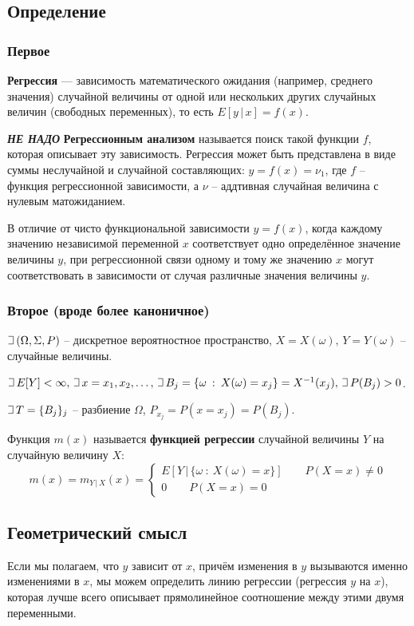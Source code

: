\documentclass{article}
\def\letus{%
    \mathord{\setbox0=\hbox{$\exists$}%
             \hbox{\kern 0.125\wd0%
                   \vbox to \ht0{%
                      \hrule width 0.75\wd0%
                      \vfill%
                      \hrule width 0.75\wd0}%
                   \vrule height \ht0%
                   \kern 0.125\wd0}%
           }%
}
\begin{document}
\subsection{Определение}
\subsubsection{Первое}
\textbf{Регрессия} — зависимость математического ожидания (например, среднего значения) случайной величины от одной или нескольких других случайных величин (свободных переменных), то есть $E[y\,|\,x]=f(x)$.

\textbf{\textit{НЕ НАДО}} \textbf{Регрессионным анализом}
называется поиск такой функции $f$, которая описывает эту зависимость. Регрессия может быть представлена в виде суммы неслучайной и случайной составляющих: $y=f(x)=\nu_1$, где $f$ -- функция регрессионной зависимости, а $\nu$ -- аддтивная случайная величина с нулевым матожиданием.

В отличие от чисто функциональной зависимости $y=f(x)$, когда каждому значению независимой переменной $x$ соответствует одно определённое значение величины $y$, при регрессионной связи одному и тому же значению $x$ могут соответствовать в зависимости от случая различные значения величины $y$.

\subsubsection{Второе (вроде более каноничное)}
$\letus \,(\Omega,\Sigma,P)$ -- дискретное вероятностное пространство, $X=X(\omega),\,Y=Y(\omega)$ -- случайные величины.

$\letus\, E[Y]<\infty,\,\letus\, x=x_1,x_2,\dots,\,\letus\,B_j=\{\omega\::\:X(\omega)=x_j\}=X^{-1}(x_j),\,\letus\,P(B_j)>0$.

$\letus\,T=\{B_j\}_j$ -- разбиение $\Omega$, $P_{x_j}=P(x=x_j)=P(B_j)$.

Функция $m(x)$ называется \textbf{функцией регрессии} случайной величины $Y$ на случайную величину $X$:
$$ m(x)=m_{Y\,|\,X}(x)=\begin{cases}
E[Y\,|\,\{\omega\::\:X(\omega)=x\}]\quad\quad P(X=x)\neq 0\\
0\quad\quad P(X=x)=0
\end{cases}$$

\subsection{Геометрический смысл}
Если мы полагаем, что $y$ зависит от $x$, причём изменения в $y$ вызываются именно изменениями в $x$, мы можем определить линию регрессии (регрессия $y$ на $x$), которая лучше всего описывает прямолинейное соотношение между этими двумя переменными.
\end{document}
